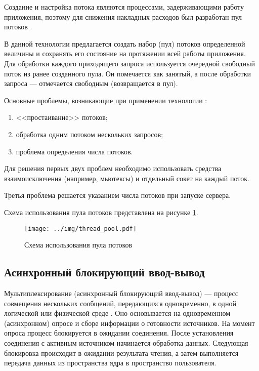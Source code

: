 Создание и настройка потока являются процессами, задерживающими работу приложения, поэтому для снижения накладных расходов был разработан пул потоков \cite{опарин2022многопоточность}.

В данной технологии предлагается создать набор (пул) потоков определенной величины и сохранять его состояние на протяжении всей работы приложения.
Для обработки каждого приходящего запроса используется очередной свободный поток из ранее созданного пула.
Он помечается как занятый, а после обработки запроса --- отмечается свободным (возвращается в пул).

Основные проблемы, возникающие при применении технологии \cite{опарин2022многопоточность}:
\begin{enumerate}
	\item <<простаивание>> потоков;
	\item обработка одним потоком нескольких запросов;
	\item проблема определения числа потоков.
\end{enumerate}

Для решения первых двух проблем необходимо использовать средства взаимоисключения (например, мьютексы) \cite{ryazan2023os} и отдельный сокет на каждый поток.

Третья проблема решается указанием числа потоков при запуске сервера.

Схема использования пула потоков представлена на рисунке \ref{img:thread_pool}.

\begin{figure}[!htb]\centering
	\texttt{[image: ../img/thread\_pool.pdf]}
	\caption{Схема использования пула потоков}
	\label{img:thread_pool}
\end{figure}

\subsection{Асинхронный блокирующий ввод-вывод}

Мультиплексирование (асинхронный блокирующий ввод-вывод) --- процесс совмещения нескольких сообщений, передающихся одновременно, в одной логической или физической среде \cite{ryazan2023os}.
Оно основывается на одновременном (асинхронном) опросе и сборе информации о готовности источников.
На момент опроса процесс блокируется в ожидании соединения.
После установления соединения с активным источником начинается обработка данных.
Следующая блокировка происходит в ожидании результата чтения, а затем выполняется передача данных из пространства ядра в пространство пользователя.

